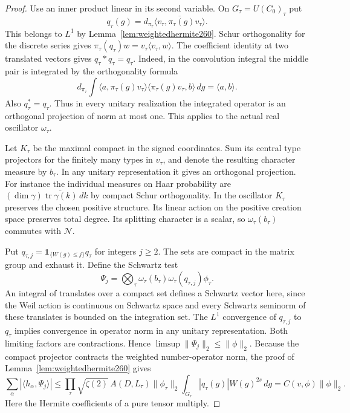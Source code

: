\documentclass[a4paper,11pt]{article}
\theoremstyle{definition}
\theoremstyle{remark}
\numberwithin{equation}{section}
\begin{document}
\begin{proof}
Use an inner product linear in its second variable. On
\(G_\tau=U(C_0)_\tau\) put
\[
       q_\tau(g)=d_{\pi_\tau}
                 \overline{\langle v_\tau,\pi_\tau(g)v_\tau\rangle}.
\]
This belongs to \(L^1\) by Lemma~\ref{lem:weightedhermite260}.
Schur orthogonality for the discrete series gives
\(\pi_\tau(q_\tau)w=v_\tau\langle v_\tau,w\rangle\).
The coefficient identity at two translated vectors gives
\(q_\tau*q_\tau=q_\tau\). Indeed, in the convolution integral
the middle pair is integrated by the orthogonality formula
\[
 d_{\pi_\tau}\int
 \langle a,\pi_\tau(g)v_\tau\rangle
 \langle\pi_\tau(g)v_\tau,b\rangle\,dg=\langle a,b\rangle .
\]
Also \(q_\tau^*=q_\tau\). Thus in every unitary realization
the integrated operator is an orthogonal projection of norm at
most one. This applies to the actual real oscillator \(\omega_\tau\).

Let \(K_\tau\) be the maximal compact in the signed coordinates.
Sum its central type projectors for the finitely many types in
\(v_\tau\), and denote the resulting character measure by \(b_\tau\).
In any unitary representation it gives an orthogonal projection.
For instance the individual measures on Haar probability are
\((\dim\gamma)\overline{\operatorname{tr}\gamma(k)}\,dk\) by
compact Schur orthogonality. In the oscillator \(K_\tau\) preserves
the chosen positive structure. Its linear action on the positive
creation space preserves total degree. Its splitting character is
a scalar, so \(\omega_\tau(b_\tau)\) commutes with \(\mathcal N\).

Put \(q_{\tau,j}=\mathbf 1_{\{W(g)\le j\}}q_\tau\) for integers
\(j\ge2\). The sets are compact in the matrix group and exhaust
it. Define the Schwartz test
\[
 \Psi_j=\bigotimes_\tau
       \omega_\tau(b_\tau)\omega_\tau(q_{\tau,j})\phi_\tau .
\]
An integral of translates over a compact set defines a Schwartz
vector here, since the Weil action is continuous on Schwartz
space and every Schwartz seminorm of these translates is bounded
on the integration set. The \(L^1\) convergence of \(q_{\tau,j}\)
to \(q_\tau\) implies convergence in operator norm in any unitary
representation. Both limiting factors are contractions. Hence
\(\limsup\|\Psi_j\|_2\le\|\phi\|_2\). Because the compact
projector contracts the weighted number-operator norm, the proof
of Lemma~\ref{lem:weightedhermite260} gives
\[
 \sum_\alpha|\langle h_\alpha,\Psi_j\rangle|
 \le\prod_\tau\sqrt{\zeta(2)}\,A(D,L_\tau)\|\phi_\tau\|_2
       \int_{G_\tau}|q_\tau(g)|W(g)^{2s}\,dg
 = C(v,\phi)\|\phi\|_2 .
\]
Here the Hermite coefficients of a pure tensor multiply.


\end{proof}
\end{document}
